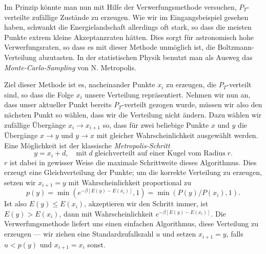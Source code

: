 Im Prinzip könnte man nun mit Hilfe der Verwerfungsmethode versuchen,
$P_T$-verteilte zufällige Zustände zu erzeugen. Wie wir im
Eingangsbeispiel gesehen haben, schwankt die Energielandschaft
allerdings oft stark, so dass die meisten Punkte extrem kleine
Akzeptanzraten hätten. Dies sorgt für astronomisch hohe
Verwerfungsraten, so dass es mit dieser Methode unmöglich ist, die
Boltzmann-Verteilung abzutasten. In der statistischen
Physik benutzt man als Ausweg das \emph{Monte-Carlo-Sampling} von
N. Metropolis.

 Ziel dieser
Methode ist es, nacheinander Punkte $x_i$ zu erzeugen, die
$P_T$-verteilt sind, so dass die Folge $x_i$ unsere Verteilung
repräsentiert. Nehmen wir nun an, dass unser aktueller Punkt bereits
$P_T$-verteilt gezogen wurde, müssen wir also den nächsten Punkt so
wählen, dass wir die Verteilung nicht ändern. Dazu wählen wir
zufällige Übergänge $x_i\to x_{i+1}$ so, dass für zwei beliebige
Punkte $x$ und $y$ die Übergänge $x\to y$ und $y\to x$ mit gleicher
Wahrscheinlichkeit ausgewählt werden. Eine Möglichkeit ist der
klassische \emph{Metropolis-Schritt}
\begin{equation}
  y = x_i + d,\quad\text{mit}\; d\;\text{gleichverteilt auf einer
    Kugel vom Radius}\; r.
\end{equation}
$r$ ist dabei in gewisser Weise die maximale Schrittweite dieses
Algorithmus. Dies erzeugt eine Gleichverteilung der Punkte; um die
korrekte Verteilung zu erzeugen, setzen wir $x_{i+1}=y$ mit
Wahrscheinlichkeit proportional zu
\begin{equation}
  p(y) = \min(e^{-\beta [E(y) - E(x_i)]}, 1) = \min(P(y)/P(x_i), 1).
\end{equation}
Ist also $E(y) \le E(x_i)$, akzeptieren wir den Schritt immer, ist
$E(y) > E(x_i)$, dann mit Wahrscheinlichkeit $e^{-\beta [E(y) -
  E(x_i)]}$. Die Verwerfungsmethode liefert uns einen einfachen
Algorithmus, diese Verteilung zu erzeugen --- wir ziehen eine
Standardzufallszahl $u$ und setzen $x_{i+1}=y$, falls $u<p(y)$ und
$x_{i+1}=x_i$ sonst.

